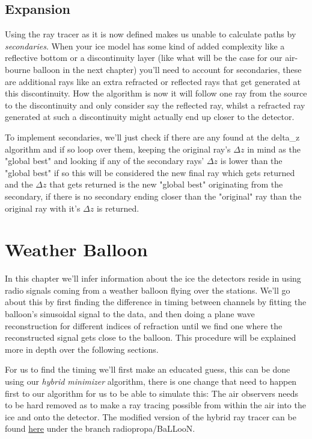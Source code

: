\documentclass[11pt,a4paper,faculty=we,language=en,doctype=report]{cls/ugent-doc}
\begin{document}
\section{Expansion}
Using the ray tracer as it is now defined makes us unable to calculate paths by \textit{secondaries}.
When your ice model has some kind of added complexity like a reflective bottom or a discontinuity layer 
(like what will be the case for our air-bourne balloon in the next chapter)
you'll need to account for secondaries, these are additional rays like an extra refracted or reflected rays that get generated at this discontinuity. How the algorithm is now it will follow one ray from the source to the discontinuity and 
only consider say the reflected ray, whilst a refracted ray generated at such a discontinuity might actually end
up closer to the detector.

To implement secondaries, we'll just check if there are any found at the delta\_z algorithm and if so loop over them,
keeping the original ray's $\Delta z$ in mind as the "global best" and looking if any of the secondary rays' $\Delta z$ is 
lower than the "global best" if so this will be considered the new final ray which gets returned and the $\Delta z$ that
gets returned is the new "global best" originating from the secondary, if there is no secondary ending closer than the "original" ray than the original ray with it's $\Delta z$ is returned.

\chapter{Weather Balloon}
\label{chap:WB}
In this chapter we'll infer information about the ice the detectors reside in
using radio signals coming from a weather balloon flying over the stations. 
We'll go about this by first finding the difference in timing between  
channels by fitting the balloon's sinusoidal signal to the data, and
then doing a plane wave reconstruction for different indices of refraction
until we find one where the reconstructed signal gets close to the balloon.
This procedure will be explained more in depth over the following sections.

For us to find the timing we'll first make an educated guess, this can be done
using our \textit{hybrid minimizer} algorithm, there is one change that need to
happen first to our algorithm for us to be able to simulate this: The air
observers needs to be hard removed as to make a ray tracing possible from
within the air into the ice and onto the detector. The modified
version of the hybrid ray tracer can be found \href{https://github.com/arthuradriaens-code/NuRadioMC.git}{here} under the branch radiopropa/BaLLooN.
\end{document}
